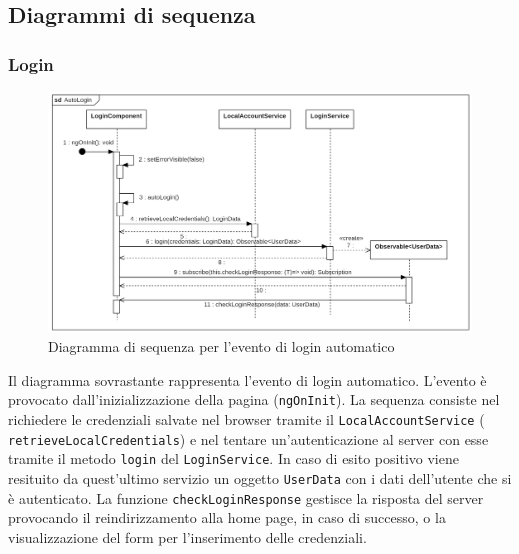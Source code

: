 \subsection{Diagrammi di sequenza}
\subsubsection{Login}
\begin{figure}[H]
	\centering
	\includegraphics[width=18cm]{res/images/webapp-autologin-diagrammaSequenza.png}
	\caption{Diagramma di sequenza per l'evento di login automatico}
	\label{fig:DiagrammaSequenzaAutoLogin}
\end{figure}
Il diagramma sovrastante rappresenta l'evento di login automatico. L'evento è provocato dall'inizializzazione della pagina (\texttt{ngOnInit}). La sequenza consiste nel richiedere le credenziali salvate nel browser tramite il \texttt{LocalAccountService} ( \texttt{retrieveLocalCredentials}) e nel tentare un'autenticazione al server con esse tramite il metodo \texttt{login} del \texttt{LoginService}. In caso di esito positivo viene resituito da quest'ultimo servizio un oggetto \texttt{UserData} con i dati dell'utente che si è autenticato. La funzione \texttt{checkLoginResponse} gestisce la risposta del server provocando il reindirizzamento alla home page, in caso di successo, o la visualizzazione del form per l'inserimento delle credenziali.
